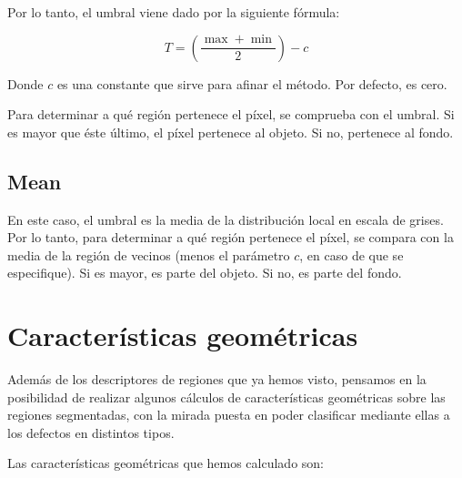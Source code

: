 Por lo tanto, el umbral viene dado por la siguiente fórmula:

\[T = (\frac{\max+\min}{2})-c\]

Donde $c$ es una constante que sirve para afinar el método. Por defecto, es cero.

Para determinar a qué región pertenece el píxel, se comprueba con el umbral. Si es mayor que éste último, el píxel pertenece al objeto. Si no, pertenece al fondo.

\subsection{Mean}
En este caso, el umbral es la media de la distribución local en escala de grises. Por lo tanto, para determinar a qué región pertenece el píxel, se compara con la media de la región de vecinos (menos el parámetro $c$, en caso de que se especifique). Si es mayor, es parte del objeto. Si no, es parte del fondo.


\section{Características geométricas}
Además de los descriptores de regiones que ya hemos visto, pensamos en la posibilidad de realizar algunos cálculos de características geométricas sobre las regiones segmentadas, con la mirada puesta en poder clasificar mediante ellas a los defectos en distintos tipos.

Las características geométricas que hemos calculado son:

